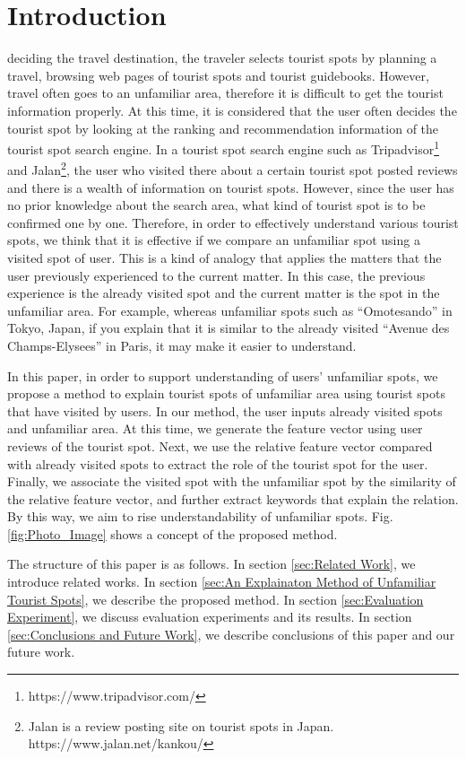 \documentclass[journal]{IAENGtran}
\begin{document}
\section{Introduction}
\label{sec:Introduction}
 deciding the travel destination, the traveler selects tourist spots by planning a travel, browsing web pages of tourist spots and tourist guidebooks.
However, travel often goes to an unfamiliar area, therefore it is difficult to get the tourist information properly.
At this time, it is considered that the user often decides the tourist spot by looking at the ranking and recommendation information of the tourist spot search engine.
In a tourist spot search engine such as Tripadvisor\footnote{https://www.tripadvisor.com/} and Jalan\footnote{Jalan is a review posting site on tourist spots in Japan. https://www.jalan.net/kankou/}, the user who visited there about a certain tourist spot posted reviews and there is a wealth of information on tourist spots.
However, since the user has no prior knowledge about the search area, what kind of tourist spot is to be confirmed one by one.
Therefore, in order to effectively understand various tourist spots, we think that it is effective if we compare an unfamiliar spot using a visited spot of user.
This is a kind of analogy that applies the matters that the user previously experienced to the current matter. In this case, the previous experience is the already visited spot and the current matter is the spot in the unfamiliar area.
For example, whereas unfamiliar spots such as ``Omotesando'' in Tokyo, Japan, if you explain that it is similar to the already visited ``Avenue des Champs-Elysees'' in Paris, it may make it easier to understand.

In this paper, in order to support understanding of users' unfamiliar spots, we propose a method to explain tourist spots of unfamiliar area using tourist spots that have visited by users.
In our method, the user inputs already visited spots and unfamiliar area.
At this time, we generate the feature vector using user reviews of the tourist spot.
Next, we use the relative feature vector compared with already visited spots to extract the role of the tourist spot for the user.
Finally, we associate the visited spot with the unfamiliar spot by the similarity of the relative feature vector, and further extract keywords that explain the relation.
By this way, we aim to rise understandability of unfamiliar spots.
Fig. \ref{fig:Photo_Image} shows a concept of the proposed method.

The structure of this paper is as follows.
In section \ref{sec:Related Work}, we introduce related works.
In section \ref{sec:An Explainaton Method of Unfamiliar Tourist Spots}, we describe the proposed method.
In section \ref{sec:Evaluation Experiment}, we discuss evaluation experiments and its results.
In section \ref{sec:Conclusions and Future Work}, we describe conclusions of this paper and our future work.
\end{document}
